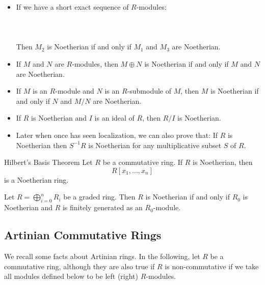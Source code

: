 \documentclass[a4paper]{article}
\begin{document}
\begin{itemize}
\item If we have a short exact sequence of $R$-modules: \\~\\
\\~\\
Then $M_2$ is Noetherian if and only if $M_1$ and $M_3$ are Noetherian. 
\item If $M$ and $N$ are $R$-modules, then $M\oplus N$ is Noetherian if and only if $M$ and $N$ are Noetherian. 
\item If $M$ is an $R$-module and $N$ is an $R$-submodule of $M$, then $M$ is Noetherian if and only if $N$ and $M/N$ are Noetherian.
\item If $R$ is Noetherian and $I$ is an ideal of $R$, then $R/I$ is Noetherian. 
\item Later when once has seen localization, we can also prove that: If $R$ is Noetherian then $S^{-1}R$ is Noetherian for any multiplicative subset $S$ of $R$. 
\end{itemize}

\begin{thm}{Hilbert's Basis Theorem}{} Let $R$ be a commutative ring. If $R$ is Noetherian, then $$R[x_1,\dots,x_n]$$ is a Noetherian ring. 
\end{thm}

\begin{prp}{}{} Let $R=\bigoplus_{i=0}^nR_i$ be a graded ring. Then $R$ is Noetherian if and only if $R_0$ is Noetherian and $R$ is finitely generated as an $R_0$-module. 
\end{prp}

\subsection{Artinian Commutative Rings}
We recall some facts about Artinian rings. In the following, let $R$ be a commutative ring, although they are also true if $R$ is non-commutative if we take all modules defined below to be left (right) $R$-modules. 
\end{document}
